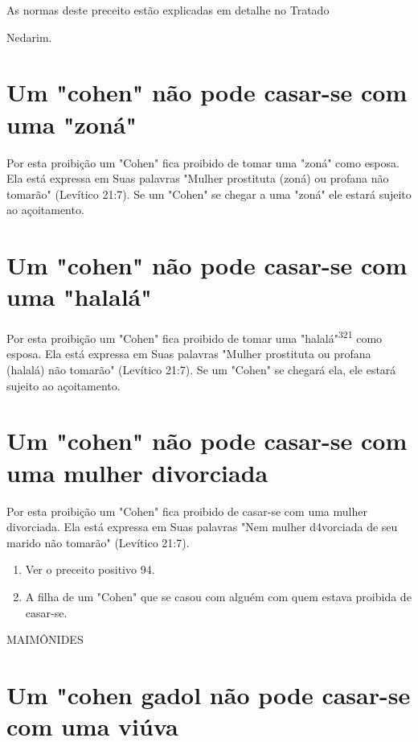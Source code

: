 \begin{itemize}
\begin{enumrate}
\begin{itemize}
\begin{itemize}
\begin{itemize}
As normas deste preceito estão explicadas em detalhe no Tratado


Nedarim.

\section{Um "cohen" não pode casar-se com uma "zoná"}

Por esta proibição um "Cohen" fica proibido de tomar uma "zoná" como
esposa. Ela está expressa em Suas palavras "Mulher prostituta (zoná) ou
profana não tomarão" (Levítico 21:7). Se um "Cohen" se chegar a uma
"zoná" ele estará sujeito ao açoitamento.

\section{Um "cohen" não pode casar-se com uma "halalá"}

Por esta proibição um "Cohen" fica proibido de tomar uma
"hala­lá"\textsuperscript{321} como esposa. Ela está expressa em Suas
palavras "Mulher prostituta ou profana (halalá) não tomarão" (Levítico
21:7). Se um "Cohen" se chegará ela, ele estará sujeito ao açoitamento.

\section{Um "cohen" não pode casar-se com uma mulher divorciada}

Por esta proibição um "Cohen" fica proibido de casar-se com uma mulher
divorciada. Ela está expressa em Suas palavras "Nem mulher d4vorcia­da
de seu marido não tomarão" (Levítico 21:7).


\begin{enumerate}
\def\labelenumi{\arabic{enumi}.}
\setcounter{enumi}{319}
\item
 
 Ver o preceito positivo 94.
 
\item
 
 A filha de um "Cohen" que se casou com alguém com quem estava proibida
 de casar-se.
 
\end{enumerate}


MAIMÔNIDES


\section{Um "cohen gadol não pode casar-se com uma viúva}



\end{itemize}
\end{itemize}
\end{itemize}
\end{enumrate}
\end{itemize}

